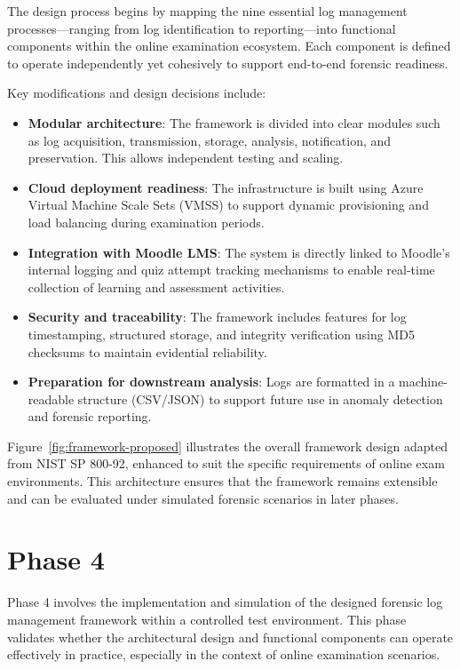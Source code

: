 The design process begins by mapping the nine essential log management processes—ranging from log identification to reporting—into functional components within the online examination ecosystem. Each component is defined to operate independently yet cohesively to support end-to-end forensic readiness.

Key modifications and design decisions include:

\begin{itemize}
    \item \textbf{Modular architecture}: The framework is divided into clear modules such as log acquisition, transmission, storage, analysis, notification, and preservation. This allows independent testing and scaling.
    
    \item \textbf{Cloud deployment readiness}: The infrastructure is built using Azure Virtual Machine Scale Sets (VMSS) to support dynamic provisioning and load balancing during examination periods.
    
    \item \textbf{Integration with Moodle LMS}: The system is directly linked to Moodle’s internal logging and quiz attempt tracking mechanisms to enable real-time collection of learning and assessment activities.
    
    \item \textbf{Security and traceability}: The framework includes features for log timestamping, structured storage, and integrity verification using MD5 checksums to maintain evidential reliability.
    
    \item \textbf{Preparation for downstream analysis}: Logs are formatted in a machine-readable structure (CSV/JSON) to support future use in anomaly detection and forensic reporting.
\end{itemize}

Figure~\ref{fig:framework-proposed} illustrates the overall framework design adapted from NIST SP 800-92, enhanced to suit the specific requirements of online exam environments. This architecture ensures that the framework remains extensible and can be evaluated under simulated forensic scenarios in later phases.

\section{Phase 4}
Phase 4 involves the implementation and simulation of the designed forensic log management framework within a controlled test environment. This phase validates whether the architectural design and functional components can operate effectively in practice, especially in the context of online examination scenarios.

